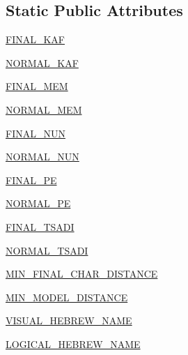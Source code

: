 \subsection*{Static Public Attributes}
\begin{DoxyCompactItemize}
\item 
\hyperlink{classpip_1_1__vendor_1_1chardet_1_1hebrewprober_1_1HebrewProber_aa685f80d12e73ff70c23db042fa52682}{F\+I\+N\+A\+L\+\_\+\+K\+AF}
\item 
\hyperlink{classpip_1_1__vendor_1_1chardet_1_1hebrewprober_1_1HebrewProber_a7c2e29d0fd0483e6feec97f05a4ac7c4}{N\+O\+R\+M\+A\+L\+\_\+\+K\+AF}
\item 
\hyperlink{classpip_1_1__vendor_1_1chardet_1_1hebrewprober_1_1HebrewProber_a6c311f0c493b66ec5f5668ba2eeaf15b}{F\+I\+N\+A\+L\+\_\+\+M\+EM}
\item 
\hyperlink{classpip_1_1__vendor_1_1chardet_1_1hebrewprober_1_1HebrewProber_a45067767287f570cb3097c32dc53c258}{N\+O\+R\+M\+A\+L\+\_\+\+M\+EM}
\item 
\hyperlink{classpip_1_1__vendor_1_1chardet_1_1hebrewprober_1_1HebrewProber_a04ab5900b892b565365b3cced8bbbf6e}{F\+I\+N\+A\+L\+\_\+\+N\+UN}
\item 
\hyperlink{classpip_1_1__vendor_1_1chardet_1_1hebrewprober_1_1HebrewProber_a732daf68c3e7846d7867d51cc9b6b9ae}{N\+O\+R\+M\+A\+L\+\_\+\+N\+UN}
\item 
\hyperlink{classpip_1_1__vendor_1_1chardet_1_1hebrewprober_1_1HebrewProber_a161ec7930340b67583b8b08fa6825bf2}{F\+I\+N\+A\+L\+\_\+\+PE}
\item 
\hyperlink{classpip_1_1__vendor_1_1chardet_1_1hebrewprober_1_1HebrewProber_a844d17f7485a7a7bfa662bd41c5915c9}{N\+O\+R\+M\+A\+L\+\_\+\+PE}
\item 
\hyperlink{classpip_1_1__vendor_1_1chardet_1_1hebrewprober_1_1HebrewProber_ad6ae7a50c3dacf63868abae8764e35e5}{F\+I\+N\+A\+L\+\_\+\+T\+S\+A\+DI}
\item 
\hyperlink{classpip_1_1__vendor_1_1chardet_1_1hebrewprober_1_1HebrewProber_a180e99e82dd2c31673d810a05a6b460c}{N\+O\+R\+M\+A\+L\+\_\+\+T\+S\+A\+DI}
\item 
\hyperlink{classpip_1_1__vendor_1_1chardet_1_1hebrewprober_1_1HebrewProber_a4bc95dfca47ffa142db53341239b504e}{M\+I\+N\+\_\+\+F\+I\+N\+A\+L\+\_\+\+C\+H\+A\+R\+\_\+\+D\+I\+S\+T\+A\+N\+CE}
\item 
\hyperlink{classpip_1_1__vendor_1_1chardet_1_1hebrewprober_1_1HebrewProber_a0b77115efa5e238192826e9ce04ac3b6}{M\+I\+N\+\_\+\+M\+O\+D\+E\+L\+\_\+\+D\+I\+S\+T\+A\+N\+CE}
\item 
\hyperlink{classpip_1_1__vendor_1_1chardet_1_1hebrewprober_1_1HebrewProber_adb565b4928648b6b5dc0242fdfd51f6b}{V\+I\+S\+U\+A\+L\+\_\+\+H\+E\+B\+R\+E\+W\+\_\+\+N\+A\+ME}
\item 
\hyperlink{classpip_1_1__vendor_1_1chardet_1_1hebrewprober_1_1HebrewProber_a9210b4cbd38aa537b6d322995e615631}{L\+O\+G\+I\+C\+A\+L\+\_\+\+H\+E\+B\+R\+E\+W\+\_\+\+N\+A\+ME}
\end{DoxyCompactItemize}
